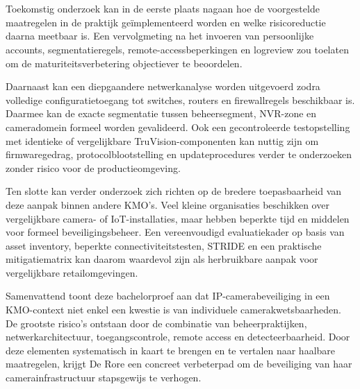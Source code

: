 \section{}%
\label{sec:conclusie-toekomstig-onderzoek}

Toekomstig onderzoek kan in de eerste plaats nagaan hoe de voorgestelde maatregelen in de praktijk geïmplementeerd worden en welke risicoreductie daarna meetbaar is. Een vervolgmeting na het invoeren van persoonlijke accounts, segmentatieregels, remote-accessbeperkingen en logreview zou toelaten om de maturiteitsverbetering objectiever te beoordelen.

Daarnaast kan een diepgaandere netwerkanalyse worden uitgevoerd zodra volledige configuratietoegang tot switches, routers en firewallregels beschikbaar is. Daarmee kan de exacte segmentatie tussen beheersegment, NVR-zone en cameradomein formeel worden gevalideerd. Ook een gecontroleerde testopstelling met identieke of vergelijkbare TruVision-componenten kan nuttig zijn om firmwaregedrag, protocolblootstelling en updateprocedures verder te onderzoeken zonder risico voor de productieomgeving.

Ten slotte kan verder onderzoek zich richten op de bredere toepasbaarheid van deze aanpak binnen andere KMO's. Veel kleine organisaties beschikken over vergelijkbare camera- of IoT-installaties, maar hebben beperkte tijd en middelen voor formeel beveiligingsbeheer. Een vereenvoudigd evaluatiekader op basis van asset inventory, beperkte connectiviteitstesten, STRIDE en een praktische mitigatiematrix kan daarom waardevol zijn als herbruikbare aanpak voor vergelijkbare retailomgevingen.

Samenvattend toont deze bachelorproef aan dat IP-camerabeveiliging in een KMO-context niet enkel een kwestie is van individuele camerakwetsbaarheden. De grootste risico's ontstaan door de combinatie van beheerpraktijken, netwerkarchitectuur, toegangscontrole, remote access en detecteerbaarheid. Door deze elementen systematisch in kaart te brengen en te vertalen naar haalbare maatregelen, krijgt De Rore een concreet verbeterpad om de beveiliging van haar camerainfrastructuur stapsgewijs te verhogen.

